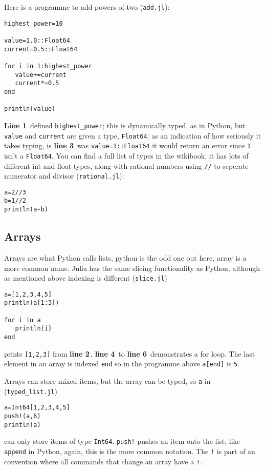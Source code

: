 \documentclass[11pt,a4paper]{scrartcl}
\newcommand{\lnn}[1]{\textbf{line #1}\,}
\newcommand{\Lnn}[1]{\textbf{Line #1}\,}
\begin{document}
Here is a programme to add powers of two (\texttt{add.jl}):
\begin{lstlisting}[numbers=right]
highest_power=10

value=1.0::Float64
current=0.5::Float64

for i in 1:highest_power
   value+=current
   current*=0.5
end

println(value)
\end{lstlisting}
\Lnn{1} defined \texttt{highest\_power}; this is dynamically typed, as
in Python, but \texttt{value} and \texttt{current} are given a type,
\texttt{Float64}; as an indication of how seriously it takes typing,
is \lnn{3} was \texttt{value=1::Float64} it would return an error
since \texttt{1} isn't a \texttt{Float64}. You can find a full list of
types in the wikibook, it has lots of different int and float types,
along with rational numbers using \texttt{//} to seperate numerator and divisor (\texttt{rational.jl}):
\begin{lstlisting}[numbers=right]
a=2//3
b=1//2
println(a-b)
\end{lstlisting}

\subsection*{Arrays}
Arrays are what Python calls lists, python is the odd one out here,
array is a more common name. Julia has the same slicing functionality
as Python, although as mentioned above indexing is different (\texttt{slice.jl})
\begin{lstlisting}[numbers=right]
a=[1,2,3,4,5]
println(a[1:3])

for i in a
   println(i)
end

\end{lstlisting}
prints \texttt{[1,2,3]} from \lnn{2}, \lnn{4} to \lnn{6} demonstrates
a for loop. The last element in an array is indexed \texttt{end} so in
the programme above \texttt{a[end]} is \texttt{5}.

Arrays can store mixed items, but the array can be typed, so \texttt{a} in (\texttt{typed\_list.jl})
\begin{lstlisting}[numbers=right]
a=Int64[1,2,3,4,5]
push!(a,6)
println(a)
\end{lstlisting}
can only store items of type \texttt{Int64}. \texttt{push!} pushes an
item onto the list, like \texttt{append} in Python, again, this is the
more common notation. The \texttt{!} is part of an convention where
all commands that change an array have a \texttt{!}.
\end{document}

